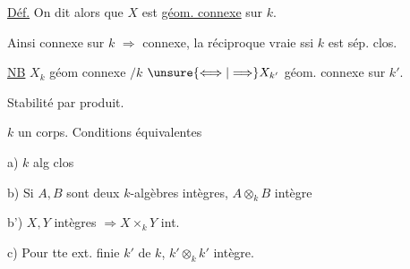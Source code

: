 \uline{Déf.} On dit alors que $X$ est \uline{géom. connexe} sur $k$.

Ainsi   connexe sur $k$ $\Rightarrow$ connexe, la réciproque vraie ssi $k$ est sép. clos.

\uline{NB} $X_k$ géom connexe $/k$ $\unsure{\Longleftrightarrow|\Longrightarrow} X_{k'}$ géom. connexe sur $k'$.

Stabilité par produit.


$k$ un corps. Conditions équivalentes


a) $k$ alg clos

b) Si $A,B$ sont deux $k$-algèbres intègres, $A\otimes_k B$ intègre

b')  $X,Y$ intègres $\Rightarrow X\times_k Y$ int.

c) Pour tte ext. finie $k'$ de $k$, $k'\otimes_k k'$ intègre.

